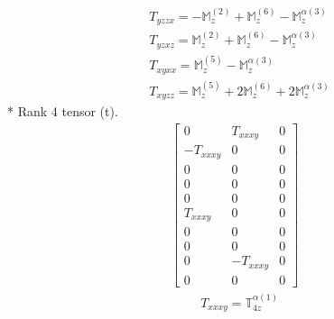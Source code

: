 \documentclass[fleqn,8pt,landscape]{jsarticle}
\begin{document}
\begin{align*}
& T_{yzzx} = - \mathbb{M}_{z}^{(2)} + \mathbb{M}_{z}^{(6)} - \mathbb{M}_{z}^{\alpha(3)} \\
& T_{yzxz} = \mathbb{M}_{z}^{(2)} + \mathbb{M}_{z}^{(6)} - \mathbb{M}_{z}^{\alpha(3)} \\
& T_{xyxx} = \mathbb{M}_{z}^{(5)} - \mathbb{M}_{z}^{\alpha(3)} \\
& T_{xyzz} = \mathbb{M}_{z}^{(5)} + 2 \mathbb{M}_{z}^{(6)} + 2 \mathbb{M}_{z}^{\alpha(3)}
\end{align*}
* Rank 4 tensor (t).
\begin{align*}
\begin{bmatrix} 0 & T_{xxxy} & 0 \\ - T_{xxxy} & 0 & 0 \\ 0 & 0 & 0 \\ 0 & 0 & 0 \\ 0 & 0 & 0 \\ T_{xxxy} & 0 & 0 \\ 0 & 0 & 0 \\ 0 & 0 & 0 \\ 0 & - T_{xxxy} & 0 \\ 0 & 0 & 0 \end{bmatrix}
\end{align*}
\begin{align*}
& T_{xxxy} = \mathbb{T}_{4z}^{\alpha(1)}
\end{align*}
\end{document}
